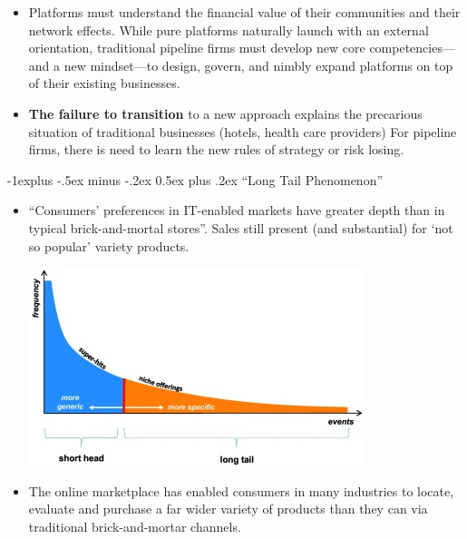 \documentclass[12pt, landscape]{article}
\makeatletter
\renewcommand{\subsection}{\@startsection{subsection}{2}{0mm}%
                                {-1explus -.5ex minus -.2ex}%
                                {0.5ex plus .2ex}%
                                {\normalfont\normalsize\bfseries}}
\makeatother
\begin{document}
\begin{multicols*}{3}
\begin{itemize}
\item Platforms must understand the financial value of their communities and their network effects. While pure platforms naturally launch with an external orientation, traditional pipeline firms must develop new core competencies—and a new mindset—to design, govern, and nimbly expand platforms on top of their existing businesses.
\item \textbf{The failure to transition} to a new approach explains the precarious situation of traditional businesses (hotels, health care providers) For pipeline firms, there is need to learn the new rules of strategy or risk losing.
\end{itemize}


\subsection{“Long Tail Phenomenon”}
\begin{itemize}
\item “Consumers’ preferences in IT-enabled markets have greater depth than in typical brick-and-mortal stores”. Sales still present (and substantial) for ‘not so popular’ variety products.
\centerline{\includegraphics[width = 0.7\linewidth]{longtail}}
\item The online marketplace has enabled consumers in many industries to locate, evaluate and purchase a far wider variety of products than they can via traditional brick-and-mortar channels.
\end{itemize}


\end{multicols*}
\end{document}

